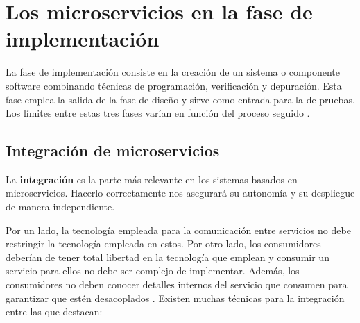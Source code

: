 \documentclass[11pt,spanish,listoffigures]{tfgetsinf}
\begin{document}
\section{Los microservicios en la fase de implementaci\'on}

La fase de implementación consiste en la creación de un sistema o componente software combinando técnicas de programación, verificación y depuración. Esta fase emplea la salida de la fase de diseño y sirve como entrada para la de pruebas. Los límites entre estas tres fases varían en función del proceso seguido \cite{Bourque2014}.

\subsection{Integración de microservicios} \label{subsect:Integracion}

La \textbf{integración} es la parte más relevante en los sistemas basados en microservicios. Hacerlo correctamente nos asegurará su autonomía y su despliegue de manera independiente.

Por un lado, la tecnología empleada para la comunicación entre servicios no debe restringir la tecnología empleada en estos. Por otro lado, los consumidores deberían de tener total libertad en la tecnología que emplean y consumir un servicio para ellos no debe ser complejo de implementar. Además, los consumidores no deben conocer detalles internos del servicio que consumen para garantizar que estén desacoplados \cite{Newman2015a}. Existen muchas técnicas para la integración entre las que destacan: 
\end{document}
